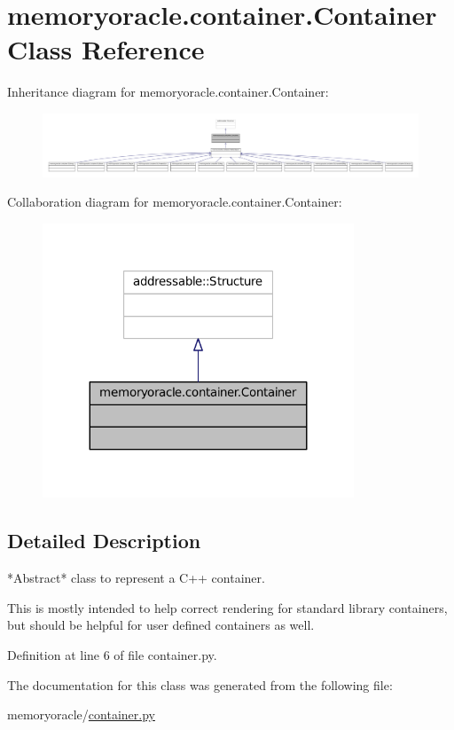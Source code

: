 \hypertarget{classmemoryoracle_1_1container_1_1Container}{}\section{memoryoracle.\+container.\+Container Class Reference}
\label{classmemoryoracle_1_1container_1_1Container}


Inheritance diagram for memoryoracle.\+container.\+Container\+:\nopagebreak
\begin{figure}[H]
\begin{center}
\leavevmode
\includegraphics[width=350pt]{classmemoryoracle_1_1container_1_1Container__inherit__graph}
\end{center}
\end{figure}


Collaboration diagram for memoryoracle.\+container.\+Container\+:\nopagebreak
\begin{figure}[H]
\begin{center}
\leavevmode
\includegraphics[width=263pt]{classmemoryoracle_1_1container_1_1Container__coll__graph}
\end{center}
\end{figure}


\subsection{Detailed Description}
\begin{DoxyVerb}*Abstract* class to represent a C++ container.

This is mostly intended to help correct rendering for
standard library containers, but should be helpful for
user defined containers as well.
\end{DoxyVerb}
 

Definition at line 6 of file container.\+py.



The documentation for this class was generated from the following file\+:\begin{DoxyCompactItemize}
\item 
memoryoracle/\hyperlink{container_8py}{container.\+py}\end{DoxyCompactItemize}
